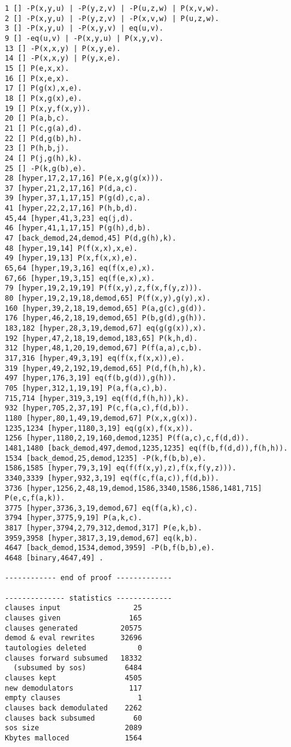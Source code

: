 {\begin{verbatim}
1 [] -P(x,y,u) | -P(y,z,v) | -P(u,z,w) | P(x,v,w).
2 [] -P(x,y,u) | -P(y,z,v) | -P(x,v,w) | P(u,z,w).
3 [] -P(x,y,u) | -P(x,y,v) | eq(u,v).
9 [] -eq(u,v) | -P(x,y,u) | P(x,y,v).
13 [] -P(x,x,y) | P(x,y,e).
14 [] -P(x,x,y) | P(y,x,e).
15 [] P(e,x,x).
16 [] P(x,e,x).
17 [] P(g(x),x,e).
18 [] P(x,g(x),e).
19 [] P(x,y,f(x,y)).
20 [] P(a,b,c).
21 [] P(c,g(a),d).
22 [] P(d,g(b),h).
23 [] P(h,b,j).
24 [] P(j,g(h),k).
25 [] -P(k,g(b),e).
28 [hyper,17,2,17,16] P(e,x,g(g(x))).
37 [hyper,21,2,17,16] P(d,a,c).
39 [hyper,37,1,17,15] P(g(d),c,a).
41 [hyper,22,2,17,16] P(h,b,d).
45,44 [hyper,41,3,23] eq(j,d).
46 [hyper,41,1,17,15] P(g(h),d,b).
47 [back_demod,24,demod,45] P(d,g(h),k).
48 [hyper,19,14] P(f(x,x),x,e).
49 [hyper,19,13] P(x,f(x,x),e).
65,64 [hyper,19,3,16] eq(f(x,e),x).
67,66 [hyper,19,3,15] eq(f(e,x),x).
79 [hyper,19,2,19,19] P(f(x,y),z,f(x,f(y,z))).
80 [hyper,19,2,19,18,demod,65] P(f(x,y),g(y),x).
160 [hyper,39,2,18,19,demod,65] P(a,g(c),g(d)).
176 [hyper,46,2,18,19,demod,65] P(b,g(d),g(h)).
183,182 [hyper,28,3,19,demod,67] eq(g(g(x)),x).
192 [hyper,47,2,18,19,demod,183,65] P(k,h,d).
312 [hyper,48,1,20,19,demod,67] P(f(a,a),c,b).
317,316 [hyper,49,3,19] eq(f(x,f(x,x)),e).
319 [hyper,49,2,192,19,demod,65] P(d,f(h,h),k).
497 [hyper,176,3,19] eq(f(b,g(d)),g(h)).
705 [hyper,312,1,19,19] P(a,f(a,c),b).
715,714 [hyper,319,3,19] eq(f(d,f(h,h)),k).
932 [hyper,705,2,37,19] P(c,f(a,c),f(d,b)).
1180 [hyper,80,1,49,19,demod,67] P(x,x,g(x)).
1235,1234 [hyper,1180,3,19] eq(g(x),f(x,x)).
1256 [hyper,1180,2,19,160,demod,1235] P(f(a,c),c,f(d,d)).
1481,1480 [back_demod,497,demod,1235,1235] eq(f(b,f(d,d)),f(h,h)).
1534 [back_demod,25,demod,1235] -P(k,f(b,b),e).
1586,1585 [hyper,79,3,19] eq(f(f(x,y),z),f(x,f(y,z))).
3340,3339 [hyper,932,3,19] eq(f(c,f(a,c)),f(d,b)).
3736 [hyper,1256,2,48,19,demod,1586,3340,1586,1586,1481,715] P(e,c,f(a,k)).
3775 [hyper,3736,3,19,demod,67] eq(f(a,k),c).
3794 [hyper,3775,9,19] P(a,k,c).
3817 [hyper,3794,2,79,312,demod,317] P(e,k,b).
3959,3958 [hyper,3817,3,19,demod,67] eq(k,b).
4647 [back_demod,1534,demod,3959] -P(b,f(b,b),e).
4648 [binary,4647,49] .

------------ end of proof -------------

-------------- statistics -------------
clauses input                 25
clauses given                165
clauses generated          20575
demod & eval rewrites      32696
tautologies deleted            0
clauses forward subsumed   18332
  (subsumed by sos)         6484
clauses kept                4505
new demodulators             117
empty clauses                  1
clauses back demodulated    2262
clauses back subsumed         60
sos size                    2089
Kbytes malloced             1564


\end{verbatim}}
